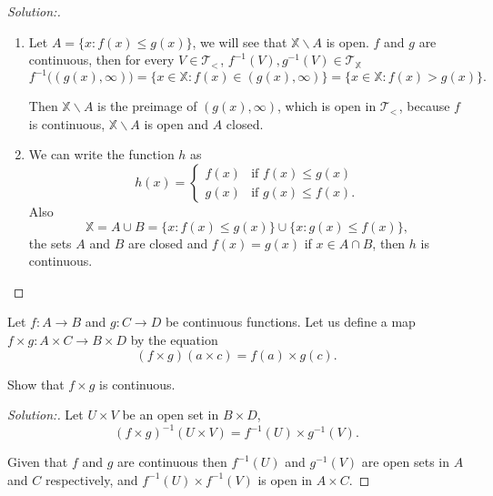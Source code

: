 \documentclass[a4paper,12pt, reqno]{article}
\theoremstyle{definition}
\newenvironment{exerr}[1]{
  \renewcommand\theexeralt{#1}
  \exeralt
}{\endexeralt}
\newenvironment{solution}{\begin{proof}[Solution:]}{\end{proof}}
\newcommand{\T}{\mathscr{T}}
\newcommand{\X}{\mathbb{X}}
\begin{document}
\begin{solution}\hfill
  \begin{enumerate}[label=(\alph*)]
    \item Let $A = \{ x : f(x)\leq g(x) \}$, we will see that $\X\backslash A$ is open. $f$ and $g$ are continuous, then for every $V\in\T_{<\,}$, $f^{-1}(V), g^{-1}(V)\in\T_{\X}$
          \begin{equation*}
            f^{-1}\big( (g(x),\infty) \big) = \{ x\in\X : f(x)\in(g(x),\infty) \} = \{ x\in\X : f(x)>g(x) \}.
          \end{equation*}

          Then $\X\backslash A$ is the preimage of $(g(x),\infty)$, which is open in $\T_{<\,}$, because $f$ is continuous, $\X\backslash A$ is open and $A$ closed.
    \item We can write the function $h$ as
          \begin{equation*}
            h(x) =\begin{cases}
              f(x) & \text{if }f(x)\leq g(x)  \\
              g(x) & \text{if }g(x)\leq f(x).
            \end{cases}
          \end{equation*}
          Also
          \begin{equation*}
            \X = A\cup B = \{ x: f(x)\leq g(x) \}\cup \{ x : g(x)\leq f(x) \},
          \end{equation*}
          the sets $A$ and $B$ are closed and $f(x) = g(x)$ if $x\in A\cap B$, then $h$ is continuous.
  \end{enumerate}
\end{solution}

\begin{exerr}{10}
  Let $f: A\to B$ and $g:C\to D$ be continuous functions. Let us define a map $f\times g: A\times C\to B\times D$ by the equation
  \begin{equation*}
    (f\times g)(a\times c) = f(a)\times g(c).
  \end{equation*}

  Show that $f\times g$ is continuous.
\end{exerr}
\begin{solution}
  Let $U\times V$ be an open set in $B\times D$,
  \begin{equation*}
    (f\times g)^{-1}(U\times V) = f^{-1}(U)\times g^{-1}(V).
  \end{equation*}

  Given that $f$ and $g$ are continuous then $f^{-1}(U)$ and $g^{-1}(V)$ are open sets in $A$ and $C$ respectively, and $f^{-1}(U)\times f^{-1}(V)$ is open in $A\times C$.
\end{solution}
\end{document}
